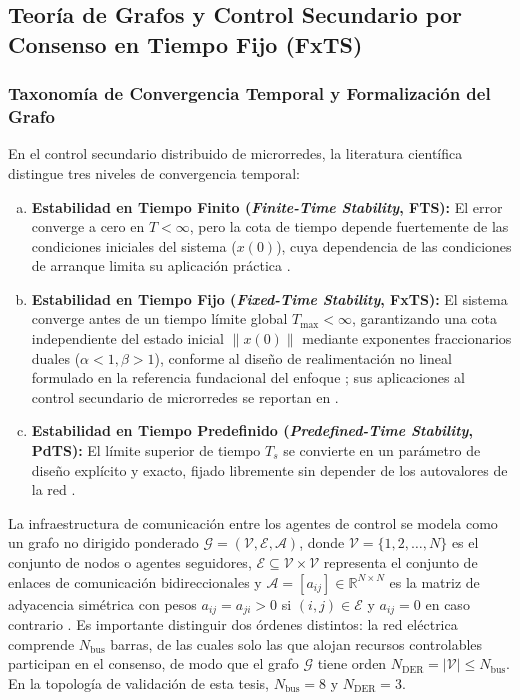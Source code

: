 \subsection{Teoría de Grafos y Control Secundario por Consenso en Tiempo Fijo (FxTS)}

\subsubsection{Taxonomía de Convergencia Temporal y Formalización del Grafo}
En el control secundario distribuido de microrredes, la literatura científica distingue tres niveles de convergencia temporal:
\begin{enumerate}[a)]
    \item \textbf{Estabilidad en Tiempo Finito (\textit{Finite-Time Stability}, FTS):} El error converge a cero en $T < \infty$, pero la cota de tiempo depende fuertemente de las condiciones iniciales del sistema ($x(0)$), cuya dependencia de las condiciones de arranque limita su aplicación práctica \citep{Shrivastava2023FiniteTime, Ning2021, Choi2022}.
    \item \textbf{Estabilidad en Tiempo Fijo (\textit{Fixed-Time Stability}, FxTS):} El sistema converge antes de un tiempo límite global $T_{\max} < \infty$, garantizando una cota independiente del estado inicial $\|x(0)\|$ mediante exponentes fraccionarios duales ($\alpha < 1, \beta > 1$), conforme al diseño de realimentación no lineal formulado en la referencia fundacional del enfoque \citep{Polyakov2012}; sus aplicaciones al control secundario de microrredes se reportan en \citep{Jasim2023, Zhuang2025}.
    \item \textbf{Estabilidad en Tiempo Predefinido (\textit{Predefined-Time Stability}, PdTS):} El límite superior de tiempo $T_s$ se convierte en un parámetro de diseño explícito y exacto, fijado libremente sin depender de los autovalores de la red \citep{Zhuang2025, Huang2023, Amrr2026}.
\end{enumerate}

La infraestructura de comunicación entre los agentes de control se modela como un grafo no dirigido ponderado $\mathcal{G} = (\mathcal{V}, \mathcal{E}, \mathcal{A})$, donde $\mathcal{V} = \{1, 2, \dots, N\}$ es el conjunto de nodos o agentes seguidores, $\mathcal{E} \subseteq \mathcal{V} \times \mathcal{V}$ representa el conjunto de enlaces de comunicación bidireccionales y $\mathcal{A} = [a_{ij}] \in \mathbb{R}^{N \times N}$ es la matriz de adyacencia simétrica con pesos $a_{ij} = a_{ji} > 0$ si $(i,j) \in \mathcal{E}$ y $a_{ij} = 0$ en caso contrario \citep{Mamun2026}. Es importante distinguir dos órdenes distintos: la red eléctrica comprende $N_{\text{bus}}$ barras, de las cuales solo las que alojan recursos controlables participan en el consenso, de modo que el grafo $\mathcal{G}$ tiene orden $N_{\text{DER}} = |\mathcal{V}| \le N_{\text{bus}}$. En la topología de validación de esta tesis, $N_{\text{bus}} = 8$ y $N_{\text{DER}} = 3$.


